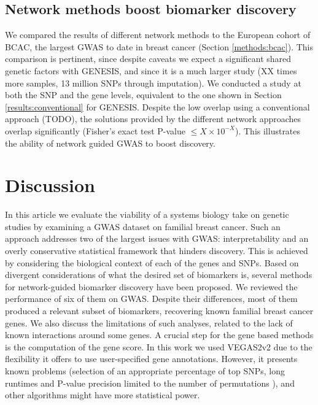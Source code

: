 \documentclass[twocolumn, 10pt]{article}
\begin{document}
\subsection{Network methods boost biomarker discovery}

We compared the results of different network methods to the European cohort of BCAC, the largest GWAS to date in breast cancer (Section \ref{methods:bcac}). This comparison is pertinent, since despite caveats we expect a significant shared genetic factors with GENESIS, and since it is a much larger study (XX times more samples, 13 million SNPs through imputation). We conducted a study at both the SNP and the gene levels, equivalent to the one shown in Section \ref{results:conventional} for GENESIS. Despite the low overlap using a conventional approach (TODO), the solutions provided by the different network approaches overlap significantly (Fisher's exact test P-value $\leq X \times 10^{-X}$). This illustrates the ability of network guided GWAS to boost discovery.

\section{Discussion}

In this article we evaluate the viability of a systems biology take on genetic studies by examining a GWAS dataset on familial breast cancer. Such an approach addresses two of the largest issues with GWAS: interpretability and an overly conservative statistical framework that hinders discovery. This is achieved by considering the biological context of each of the genes and SNPs. Based on divergent considerations of what the desired set of biomarkers is, several methods for network-guided biomarker discovery have been proposed. We reviewed the performance of six of them on GWAS. Despite their differences, most of them produced a relevant subset of biomarkers, recovering known familial breast cancer genes. We also discuss the limitations of such analyses, related to the lack of known interactions around some genes. A crucial step for the gene based methods is the computation of the gene score. In this work we used VEGAS2v2 \cite{mishra_vegas2:_2015} due to the flexibility it offers to use user-specified gene annotations. However, it presents known problems (selection of an appropriate percentage of top SNPs, long runtimes and P-value precision limited to the number of permutations \cite{nakka_gene_2016}), and other algorithms might have more statistical power. 
\end{document}
